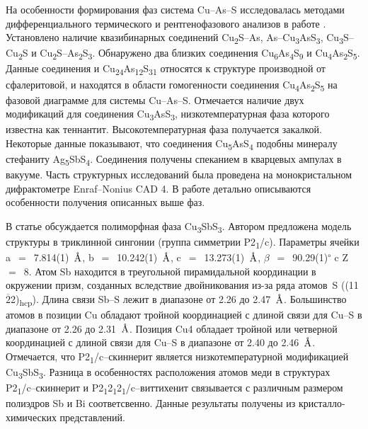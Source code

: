 На особенности формирования фаз система Cu--As--S исследовалась методами дифференциального термического и рентгенофазового анализов в работе \cite{Kurz_1989}. Установлено наличие квазибинарных соединений Cu\textsubscript{2}S--As, As--Cu\textsubscript{3}AsS\textsubscript{3}, Cu\textsubscript{3}S--Cu\textsubscript{2}S и Cu\textsubscript{2}S--As\textsubscript{2}S\textsubscript{3}. Обнаружено два близких соединения Cu\textsubscript{6}As\textsubscript{4}S\textsubscript{9} и Cu\textsubscript{4}As\textsubscript{2}S\textsubscript{5}. Данные соединения и Cu\textsubscript{24}As\textsubscript{12}S\textsubscript{31} относятся к структуре производной от сфалеритовой, и находятся в области гомогенности соединения Cu\textsubscript{4}As\textsubscript{2}S\textsubscript{5} на фазовой диаграмме для системы  Cu--As--S. Отмечается наличие двух модификаций для соединения Cu\textsubscript{3}AsS\textsubscript{3}, низкотемпературная фаза которого известна как теннантит. Высокотемпературная фаза получается закалкой. Некоторые данные показывают, что соединения Cu\textsubscript{5}AsS\textsubscript{4} подобны минералу стефаниту Ag\textsubscript{5}SbS\textsubscript{4}. Соединения получены спеканием в кварцевых ампулах в вакууме. Часть структурных исследований была проведена на монокристальном дифрактометре Enraf--Nonius CAD 4. В работе детально описываются особенности получения описанных выше фаз.

В статье \cite{Makovicky1995} обсуждается полиморфная фаза Cu\textsubscript{3}SbS\textsubscript{3}. Автором предложена модель  структуры в триклинной сингонии (группа симметрии P2\textsubscript{1}/c). Параметры ячейки a~$=$~7.814(1)~$\mbox{\normalfont\AA}$, b~$=$~10.242(1)~$\mbox{\normalfont\AA}$, c~$=$~13.273(1)~$\mbox{\normalfont\AA}$, $\beta$~$=$~90.29(1)\textsuperscript{$\circ$} c Z~$=$~8. Атом Sb находится в треугольной пирамидальной координации в окружении призм, созданных вследствие двойникования из-за ряда атомов~S ((11$\overline{\!2}$2)\textsubscript{hcp}). Длина связи Sb--S лежит в диапазоне от 2.26 до 2.47~$\mbox{\normalfont\AA}$. Большинство атомов в позиции Cu обладают тройной координацией с длиной связи для Cu--S в диапазоне от 2.26 до 2.31~$\mbox{\normalfont\AA}$. Позиция Cu4 обладает тройной или четверной координацией с длиной связи для Cu--S в диапазоне от 2.40 до 2.46~$\mbox{\normalfont\AA}$. Отмечается, что P2\textsubscript{1}/c--скиннерит является низкотемпературной модификацией Cu\textsubscript{3}SbS\textsubscript{3}. Разница в особенностях расположения атомов меди в структурах P2\textsubscript{1}/c--скиннерит и P2\textsubscript{1}2\textsubscript{1}2\textsubscript{1}/c--виттихенит связывается с различным размером полиэдров Sb и Bi соответсвенно. Данные результаты получены из кристалло-химических представлений.

